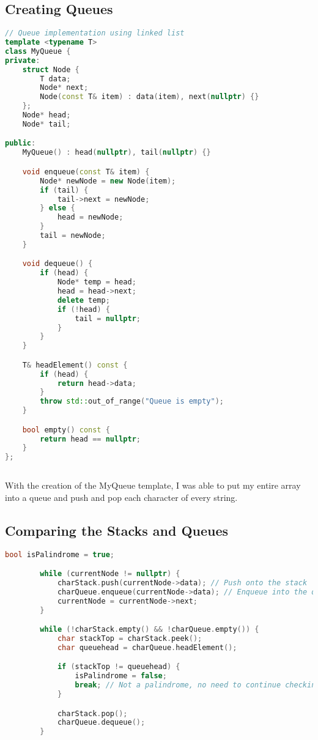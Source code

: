 \documentclass[letterpaper, 10pt,DIV=13]{scrartcl}
\numberwithin{equation}{section} %
\numberwithin{figure}{section} %
\numberwithin{table}{section} %
\begin{document}
\subsection{Creating Queues}
\begin{lstlisting}[language=c++, caption= Creation of the Queue Class]
// Queue implementation using linked list
template <typename T>
class MyQueue {
private:
    struct Node {
        T data;
        Node* next;
        Node(const T& item) : data(item), next(nullptr) {}
    };
    Node* head;
    Node* tail;

public:
    MyQueue() : head(nullptr), tail(nullptr) {}

    void enqueue(const T& item) {
        Node* newNode = new Node(item);
        if (tail) {
            tail->next = newNode;
        } else {
            head = newNode;
        }
        tail = newNode;
    }

    void dequeue() {
        if (head) {
            Node* temp = head;
            head = head->next;
            delete temp;
            if (!head) {
                tail = nullptr;
            }
        }
    }

    T& headElement() const {
        if (head) {
            return head->data;
        }
        throw std::out_of_range("Queue is empty");
    }

    bool empty() const {
        return head == nullptr;
    }
};
    
\end{lstlisting}
With the creation of the MyQueue template, I was able to put my entire array into a queue and push and pop each character of every string.

\subsection{Comparing the Stacks and Queues}
\begin{lstlisting}[language=c++, caption= Comparing each character to see if it is a palendrome]
bool isPalindrome = true;

        while (currentNode != nullptr) {
            charStack.push(currentNode->data); // Push onto the stack
            charQueue.enqueue(currentNode->data); // Enqueue into the queue
            currentNode = currentNode->next;
        }

        while (!charStack.empty() && !charQueue.empty()) {
            char stackTop = charStack.peek();
            char queuehead = charQueue.headElement();

            if (stackTop != queuehead) {
                isPalindrome = false;
                break; // Not a palindrome, no need to continue checking
            }

            charStack.pop();
            charQueue.dequeue();
        }
\end{lstlisting}
\end{document}
